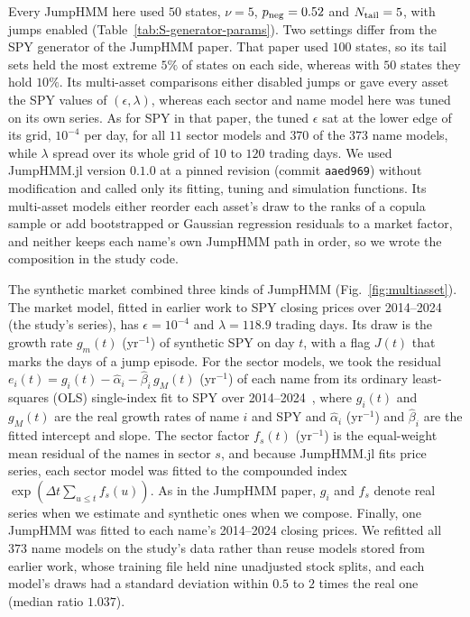 Every JumpHMM here used $50$ states, $\nu = 5$, $p_{\rm neg} = 0.52$ and $N_{\rm tail} = 5$, with jumps enabled
(Table~\ref{tab:S-generator-params}). Two settings differ from the SPY generator of the JumpHMM paper. That paper used
$100$ states, so its tail sets held the most extreme $5\%$ of states on each side, whereas with $50$ states they hold
$10\%$. Its multi-asset comparisons either disabled jumps or gave every asset the SPY values of $(\epsilon, \lambda)$,
whereas each sector and name model here was tuned on its own series. As for SPY in that paper, the tuned $\epsilon$
sat at the lower edge of its grid, $10^{-4}$ per day, for all $11$ sector models and $370$ of the $373$ name models,
while $\lambda$ spread over its whole grid of $10$ to $120$ trading days. We used JumpHMM.jl version $0.1.0$ at a
pinned revision (commit \texttt{aaed969}) without modification and called only its fitting, tuning and simulation
functions. Its multi-asset models either reorder each asset's draw to the ranks of a copula sample or add
bootstrapped or Gaussian regression residuals to a market factor, and neither keeps each name's own JumpHMM path in
order, so we wrote the composition in the study code.

The synthetic market combined three kinds of JumpHMM (Fig.~\ref{fig:multiasset}). The market model, fitted in
earlier work to SPY closing prices over 2014--2024 (the study's series), has $\epsilon = 10^{-4}$ and
$\lambda = 118.9$ trading days. Its draw is the growth rate $g_m(t)$ (yr$^{-1}$) of synthetic SPY on day $t$, with a
flag $J(t)$ that marks the days of a jump episode. For the sector models, we took the residual
$e_i(t) = g_i(t) - \hat\alpha_i - \hat\beta_i\, g_M(t)$ (yr$^{-1}$) of each name from its ordinary least-squares
(OLS) single-index fit to SPY over 2014--2024~\cite{sharpe1963}, where $g_i(t)$ and $g_M(t)$ are the real growth rates
of name $i$ and SPY and $\hat\alpha_i$ (yr$^{-1}$) and $\hat\beta_i$ are the fitted intercept and slope. The sector
factor $f_s(t)$ (yr$^{-1}$) is the equal-weight mean residual of the names in sector $s$, and because JumpHMM.jl fits
price series, each sector model was fitted to the compounded index $\exp(\Delta t \sum_{u \le t} f_s(u))$. As in the
JumpHMM paper, $g_i$ and $f_s$ denote real series when we estimate and synthetic ones when we compose. Finally, one
JumpHMM was fitted to each name's 2014--2024 closing prices. We refitted all $373$ name models on the study's data
rather than reuse models stored from earlier work, whose training file held nine unadjusted stock splits, and each
model's draws had a standard deviation within $0.5$ to $2$ times the real one (median ratio $1.037$).

